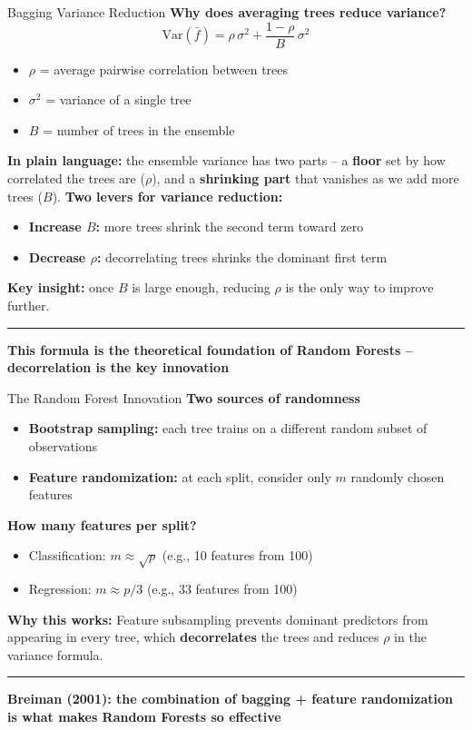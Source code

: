 \documentclass[8pt,aspectratio=169]{beamer}
\newcommand{\bottomnote}[1]{%
\vfill
\vspace{-2mm}
\textcolor{mllavender2}{\rule{\textwidth}{0.4pt}}
\vspace{1mm}
\footnotesize
\textbf{#1}
}
\newcommand{\highlight}[1]{\textcolor{mlorange}{\textbf{#1}}}
\begin{document}
\begin{frame}[t]{Bagging Variance Reduction}
\textbf{Why does averaging trees reduce variance?}
\[
\text{Var}(\bar{f}) = \rho\,\sigma^2 + \frac{1 - \rho}{B}\,\sigma^2
\]
\begin{itemize}
  \item $\rho$ = average pairwise correlation between trees
  \item $\sigma^2$ = variance of a single tree
  \item $B$ = number of trees in the ensemble
\end{itemize}
\vspace{0.5em}
\textbf{In plain language:} the ensemble variance has two parts -- a \highlight{floor} set by how correlated the trees are ($\rho$), and a \highlight{shrinking part} that vanishes as we add more trees ($B$).
\vspace{0.3em}
\textbf{Two levers for variance reduction:}
\begin{itemize}
  \item \highlight{Increase $B$:} more trees shrink the second term toward zero
  \item \highlight{Decrease $\rho$:} decorrelating trees shrinks the dominant first term
\end{itemize}
\vspace{0.3em}
\textbf{Key insight:} once $B$ is large enough, reducing $\rho$ is the only way to improve further.
\bottomnote{This formula is the theoretical foundation of Random Forests -- decorrelation is the key innovation}
\end{frame}

\begin{frame}[t]{The Random Forest Innovation}
\textbf{Two sources of randomness}
\begin{itemize}
  \item \highlight{Bootstrap sampling:} each tree trains on a different random subset of observations
  \item \highlight{Feature randomization:} at each split, consider only $m$ randomly chosen features
\end{itemize}
\vspace{0.5em}
\textbf{How many features per split?}
\begin{itemize}
  \item Classification: $m \approx \sqrt{p}$ \quad (e.g., 10 features from 100)
  \item Regression: $m \approx p/3$ \quad (e.g., 33 features from 100)
\end{itemize}
\vspace{0.5em}
\textbf{Why this works:} Feature subsampling prevents dominant predictors from appearing in every tree, which \highlight{decorrelates} the trees and reduces $\rho$ in the variance formula.
\bottomnote{Breiman (2001): the combination of bagging + feature randomization is what makes Random Forests so effective}
\end{frame}
\end{document}
